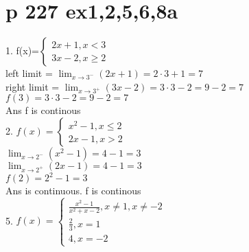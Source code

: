 \documentclass{article}
\begin{document}
  \section{p 227 ex1,2,5,6,8a}
  1. f(x)=$\begin{cases}
    2x+1,x<3\\
    3x-2,x\geq2
  \end{cases}$\\
  left limit = $\lim_{x\to3^-}(2x+1)=2\cdot3+1=7$\\
  right limit = $\lim_{x\to3^+}(3x-2)=3\cdot3-2=9-2=7$\\
  $f(3)=3\cdot3-2=9-2=7$\\
  Ans f is continous\\
  2. $f(x)=\begin{cases}
    x^2-1,x\leq2\\
    2x-1,x>2
  \end{cases}$\\
  $\lim_{x\to2^-}(x^2-1)=4-1=3$\\
  $\lim_{x\to2^+}(2x-1)=4-1=3$\\
  $f(2)=2^2-1=3$\\ Ans is continuous.
  f is continous\\
  5. $f(x)=\begin{cases}
    \frac{x^2-1}{x^2+x-2}, x\neq1,x\neq-2\\
    \frac{2}{3}, x=1\\
    4, x=-2
  \end{cases}$\\

  
\end{document}
